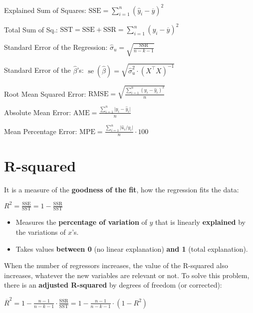 \documentclass[10pt, a4paper, landscape]{article}
\DeclareMathOperator{\se}{se}
\newcommand{\SSR}{\text{SSR}}
\newcommand{\SSE}{\text{SSE}}
\newcommand{\SST}{\text{SST}}
\begin{document}
\begin{multicols}{3}
Explained Sum of Squares: \hfill \( \SSE = \sum_{i = 1}^{n} (\hat{y}_{i} - \overline{y})^{2} \)

Total Sum of Sq.: \hfill \( \SST = \SSE + \SSR = \sum_{i = 1}^{n} (y_{i} - \overline{y})^{2} \)

Standard Error of the Regression: \hfill \( \hat{\sigma}_{u} = \sqrt{\frac{\SSR}{n - k - 1}} \)

Standard Error of the \( \hat{\beta} \)'s: \hfill \( \se(\hat{\beta}) = \sqrt{\hat{\sigma}_{u}^{2} \cdot (X^{\top} X)^{-1}} \)

Root Mean Squared Error: \hfill \( \text{RMSE} = \sqrt{\frac{\sum_{i = 1}^{n} (y_{i} - \hat{y}_{i})^{2}}{n}} \)

Absolute Mean Error: \hfill \( \text{AME} = \frac{\sum_{i = 1}^{n} \lvert y_{i} - \hat{y}_{i} \rvert}{n} \)

Mean Percentage Error: \hfill \( \text{MPE} = \frac{\sum_{i = 1}^{n} \lvert \hat{u}_{i} / y_{i} \rvert}{n} \cdot 100 \)

\columnbreak

\section*{R-squared}

It is a measure of the \textbf{goodness of the fit}, how the regression fits the data:

\begin{center}
	\( R^{2} = \frac{\SSE}{\SST} = 1 - \frac{\SSR}{\SST} \)
\end{center}

\begin{itemize}[leftmargin=*]
	\item Measures the \textbf{percentage of variation} of \( y \) that is linearly \textbf{explained} by the variations of \( x \)'s.
	\item Takes values \textbf{between 0} (no linear explanation) \textbf{and 1} (total explanation).
\end{itemize}

When the number of regressors increases, the value of the R-squared also increases, whatever the new variables are relevant or not. To solve this problem, there is an \textbf{adjusted R-squared} by degrees of freedom (or corrected):

\begin{center}
	\( \overline{R}^{2} = 1 - \frac{n - 1}{n - k - 1} \cdot \frac{\SSR}{\SST} = 1 - \frac{n - 1}{n - k - 1} \cdot (1 - R^{2}) \)
\end{center}


\end{multicols}
\end{document}
